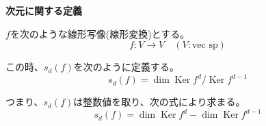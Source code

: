 \documentclass[12pt,b5paper]{ltjsarticle}
\newcommand{\Ker}{\mathop{\mathrm{Ker}}\nolimits}
\begin{document}
\hrulefill

\textbf{次元に関する定義}

$f$を次のような線形写像(線形変換)とする。
\begin{equation}
 f: V \rightarrow V \quad (V:\text{vec sp})
\end{equation}

この時、$s_d(f)$を次のように定義する。
\begin{equation}
 s_d(f) = \dim \Ker f^d / \Ker f^{d-1}
\end{equation}

つまり、$s_d(f)$は整数値を取り、次の式により求まる。
\begin{equation}
 s_d(f) = \dim \Ker f^d - \dim \Ker f^{d-1}
\end{equation}

\hrulefill
\end{document}

